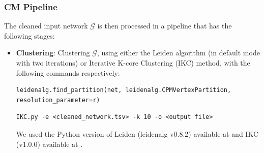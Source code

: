 \documentclass[a4paper]{article}   	%
\begin{document}
\subsubsection*{CM Pipeline}
The cleaned input network $\mathcal{G}$ is then processed in a pipeline that has the following stages:
\begin{itemize}
\item \textbf{Clustering}: Clustering $\mathcal{G}$, using either the Leiden algorithm (in default mode with two iterations) or Iterative K-core Clustering (IKC) method, with the following commands respectively:

\begin{lstlisting}[basicstyle=\ttfamily\small]
leidenalg.find_partition(net, leidenalg.CPMVertexPartition, resolution_parameter=r)
\end{lstlisting}

\begin{lstlisting}[basicstyle=\ttfamily\small]
IKC.py -e <cleaned_network.tsv> -k 10 -o <output file>
\end{lstlisting}

We used the Python version of Leiden (leidenalg v0.8.2) available at \cite{leiden-code} and
IKC (v1.0.0) available at \cite{ikc-code}.




\end{itemize}
\end{document}
